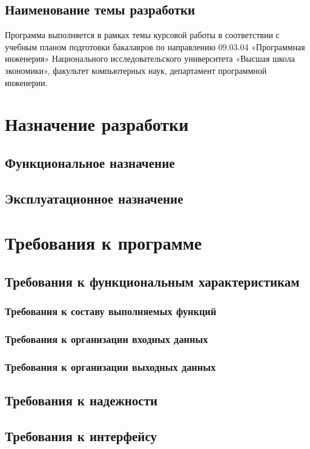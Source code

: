 \documentclass[a4paper,12pt]{article}
\begin{document}
	\subsection{Наименование темы разработки}
	Программа выполняется в рамках темы курсовой работы в соответствии с учебным планом подготовки бакалавров по направлению 09.03.04 «Программная инженерия» Национального исследовательского университета «Высшая школа экономики», факультет компьютерных наук, департамент программной инженерии.
	
	\newpage 
	\section{Назначение разработки}
	\subsection{Функциональное назначение}
	\subsection{Эксплуатационное назначение}
	
						\newpage
	\section{Требования к программе}
	\subsection{Требования к функциональным характеристикам}
	\subsubsection{Требования к составу выполняемых функций}
	\subsubsection{Требования к организации входных данных}
	\subsubsection{Требования к организации выходных данных}
	\subsection{Требования к надежности}
	\subsection{Требования к интерфейсу}
\end{document}
